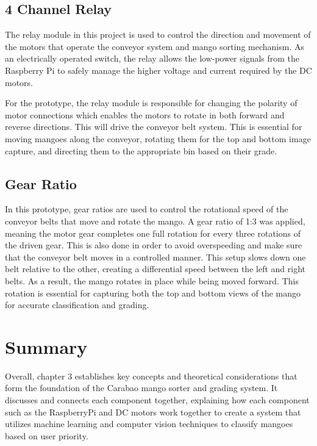 \subsection{4 Channel Relay}
The relay module in this project is used to control the direction and movement
of the motors that operate the conveyor system and mango sorting mechanism. As
an electrically operated switch, the relay allows the low-power signals from the
Raspberry Pi to safely manage the higher voltage and current required by the DC
motors.

For the prototype, the relay module is responsible for changing the polarity of
motor connections which enables the motors to rotate in both forward and reverse
directions. This will drive the conveyor belt system. This is essential for
moving mangoes along the conveyor, rotating them for the top and bottom image
capture, and directing them to the appropriate bin based on their grade.

\subsection{Gear Ratio}

In this prototype, gear ratios are used to control the rotational speed of the
conveyor belts that move and rotate the mango. A gear ratio of 1:3 was applied,
meaning the motor gear completes one full rotation for every three rotations of
the driven gear. This is also done in order to avoid overspeeding and make sure
that the conveyor belt moves in a controlled manner. This setup slows down one
belt relative to the other, creating a differential speed between the left and
right belts. As a result, the mango rotates in place while being moved forward.
This rotation is essential for capturing both the top and bottom views of the
mango for accurate classification and grading.


\section{Summary}

Overall, chapter 3 establishes key concepts and theoretical considerations that form the foundation of the Carabao mango sorter and grading system. It discusses and connects each component together, explaining how each component such as the RaspberryPi and DC motors work together to create a system that utilizes machine learning and computer vision techniques to classify mangoes based on user priority.
